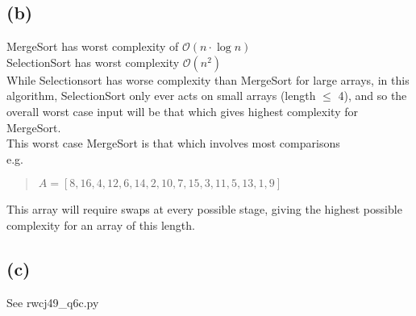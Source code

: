 \documentclass[12pt]{article}%
\begin{document}
\subsection*{(b)}
MergeSort has worst complexity of $\mathcal{O} (n \cdot \log n)$\\
SelectionSort has worst complexity $\mathcal{O}(n^2)$ \\

\noindent
While Selectionsort has worse complexity than MergeSort for large arrays, in this algorithm, SelectionSort only ever acts on small arrays (length $\leq$ 4), and so the overall worst case input will be that which gives highest complexity for MergeSort.\\
This worst case MergeSort is that which involves most comparisons\\
e.g.
\begin{quote}
    $A = [8,16,4,12,6,14,2,10,7,15,3,11,5,13,1,9]$
\end{quote}
    This array will require swaps at every possible stage, giving the highest possible complexity for an array of this length.
\subsection*{(c)}
See rwcj49\_q6c.py
\end{document}
